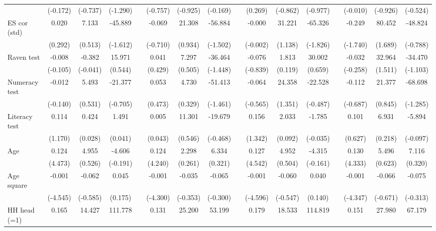 {\begin{longtable}{@{\extracolsep{\fill}}lccccccccccccccc}
          & (-0.172) & (-0.737) & (-1.290) &       & (-0.757) & (-0.925) & (-0.169) &       & (0.269) & (-0.862) & (-0.977) &       & (-0.010) & (-0.926) & (-0.524) \\
    ES cor (std) & 0.020 & 7.133 & -45.889 &       & -0.069 & 21.308 & -56.884 &       & -0.000 & 31.221 & -65.326 &       & -0.249 & 80.452 & -48.824 \\
          & (0.292) & (0.513) & (-1.612) &       & (-0.710) & (0.934) & (-1.502) &       & (-0.002) & (1.138) & (-1.826) &       & (-1.740) & (1.689) & (-0.788) \\
    Raven test & -0.008 & -0.382 & 15.971 &       & 0.041 & 7.297 & -36.464 &       & -0.076 & 1.813 & 30.002 &       & -0.032 & 32.964 & -34.470 \\
          & (-0.105) & (-0.041) & (0.544) &       & (0.429) & (0.505) & (-1.448) &       & (-0.839) & (0.119) & (0.659) &       & (-0.258) & (1.511) & (-1.103) \\
    Numeracy test & -0.012 & 5.493 & -21.377 &       & 0.053 & 4.730 & -51.413 &       & -0.064 & 24.358 & -22.528 &       & -0.112 & 21.377 & -68.698 \\
          & (-0.140) & (0.531) & (-0.705) &       & (0.473) & (0.329) & (-1.461) &       & (-0.565) & (1.351) & (-0.487) &       & (-0.687) & (0.845) & (-1.285) \\
    Literacy test & 0.114 & 0.424 & 1.491 &       & 0.005 & 11.301 & -19.679 &       & 0.156 & 2.033 & -1.785 &       & 0.101 & 6.931 & -5.894 \\
          & (1.170) & (0.028) & (0.041) &       & (0.043) & (0.546) & (-0.468) &       & (1.342) & (0.092) & (-0.035) &       & (0.627) & (0.218) & (-0.097) \\
    Age   & 0.124 & 4.955 & -4.606 &       & 0.124 & 2.298 & 6.334 &       & 0.127 & 4.952 & -4.315 &       & 0.130 & 5.496 & 7.116 \\
          & (4.473) & (0.526) & (-0.191) &       & (4.240) & (0.261) & (0.321) &       & (4.542) & (0.504) & (-0.161) &       & (4.333) & (0.623) & (0.320) \\
    Age square & -0.001 & -0.062 & 0.045 &       & -0.001 & -0.035 & -0.065 &       & -0.001 & -0.060 & 0.040 &       & -0.001 & -0.066 & -0.075 \\
          & (-4.545) & (-0.585) & (0.175) &       & (-4.300) & (-0.353) & (-0.300) &       & (-4.596) & (-0.547) & (0.140) &       & (-4.347) & (-0.671) & (-0.313) \\
    HH head (=1) & 0.165 & 14.427 & 111.778 &       & 0.131 & 25.200 & 53.199 &       & 0.179 & 18.533 & 114.819 &       & 0.151 & 27.980 & 67.179 \\

\end{longtable}}
